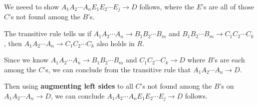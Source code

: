 \documentclass[12pt]{article}
\begin{document}
\begin{enumerate}[1.]
\begin{enumerate}[a)]
            \bigskip

            We neeed to show $A_1A_2\cdots A_n E_1E_2 \cdots E_j \to D$ follows,
            where the $E$'s are all of those $C$'s not found among the $B$'s.

            \bigskip

            The transitive rule tells us if $A_1A_2\cdots A_n \to B_1B_2 \cdots B_m$
            and $B_1B_2 \cdots B_m \to C_1 C_2 \cdots C_k$, then $A_1A_2 \cdots A_n \to C_1 C_2 \cdots C_k$
            also holds in $R$.

            \bigskip

            Since we know $A_1A_2 \cdots A_n \to B_1B_2 \cdots B_m$ and $C_1C_2 \cdots C_k \to D$
            where $B$'s are each among the $C$'s, we can conclude from the transitive rule
            that $A_1A_2 \cdots A_n \to D$.

            \bigskip

            Then using \textbf{augmenting left sides} to all $C$'s not found among the $B$'s
            on $A_1 A_2 \cdots A_n \to D$, we can conclude $A_1A_2 \cdots A_n E_1 E_2 \cdots E_j \to D$ follows.


            \bigskip













\end{enumerate}
\end{enumerate}
\end{document}
